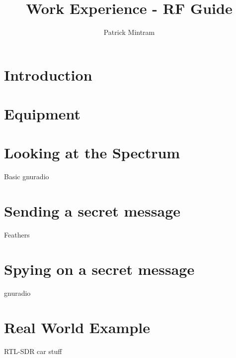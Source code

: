\documentclass[titlepage,a4paper]{article}
\begin{document}
\title{Work Experience - RF Guide}
\author{Patrick Mintram}
\maketitle

\tableofcontents
\listoffigures
\printglossaries
\newpage

\section{Introduction}

\newpage

\section{Equipment}

\newpage

\section{Looking at the Spectrum}
Basic gnuradio
\newpage

\section{Sending a secret message}
Feathers
\newpage

\section{Spying on a secret message}
gnuradio
\newpage

\section{Real World Example}
RTL-SDR car stuff
\newpage
\end{document}
